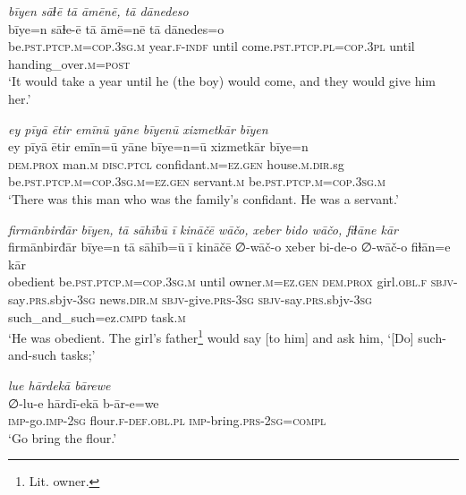 \ea \label{RE.15}
\textit{bīyen sāɫē tā āmēnē, tā dānedeso} \\ 
\gll bīye=n sāɫe-ē tā āmē=nē tā dānedes=o \\ 
 be\textsc{.pst}\textsc{.ptcp}\textsc{.m}\textsc{=cop}\textsc{.3sg}\textsc{.m} year\textsc{.f}\textsc{-indf} until come\textsc{.pst}\textsc{.ptcp}\textsc{.pl}\textsc{=cop}\textsc{.3pl} until handing\_over\textsc{.m}\textsc{=\textsc{post}} \\ 
\glt `It would take a year until he (the boy) would come, and they would give him her.'
\z 
 
\ea \label{RE.16}
\textit{ey pīyā ētir emīnū yāne bīyenū xizmetkār bīyen} \\ 
\gll ey pīyā ētir emīn=ū yāne bīye=n=ū xizmetkār bīye=n \\ 
 \textsc{dem.prox} man\textsc{.m} \textsc{disc.ptcl} confidant\textsc{.m}\textsc{=ez.gen} house\textsc{.m}\textsc{.dir}.sg be\textsc{.pst}\textsc{.ptcp}\textsc{.m}\textsc{=cop}\textsc{.3sg}\textsc{.m}\textsc{=ez.gen} servant\textsc{.m} be\textsc{.pst}\textsc{.ptcp}\textsc{.m}\textsc{=cop}\textsc{.3sg}\textsc{.m} \\ 
\glt `There was this man who was the family’s confidant. He was a servant.'
\z 
 
\ea \label{RE.18}
\textit{firmānbirđār bīyen, tā sāhībū ī kināčē wāčo, xeber bido wāčo, fiɫāne kār} \\ 
\gll firmānbirđār bīye=n tā sāhīb=ū ī kināčē ∅-wāč-o xeber bi-de-o ∅-wāč-o fiɫān=e kār \\ 
 obedient be\textsc{.pst}\textsc{.ptcp}\textsc{.m}\textsc{=cop}\textsc{.3sg}\textsc{.m} until owner\textsc{.m}\textsc{=ez.gen} \textsc{dem.prox} girl\textsc{.obl}\textsc{.f} \textsc{sbjv-}say\textsc{.prs}.sbjv\textsc{-3sg} news\textsc{.dir}\textsc{.m} \textsc{sbjv-}give\textsc{.prs}\textsc{-3sg} \textsc{sbjv-}say\textsc{.prs}.sbjv\textsc{-3sg} such\_and\_such=ez\textsc{.cmpd} task\textsc{.m} \\ 
\glt `He was obedient. The girl’s father\footnote{Lit. owner.} would say [to him] and ask him, ‘[Do] such-and-such tasks;'
\z 
 
\ea \label{RE.19}
\textit{lue hārdekā bārewe} \\ 
\gll ∅-lu-e hārdī-ekā b-ār-e=we \\ 
 \textsc{imp-}go.\textsc{imp-}\textsc{2sg} flour\textsc{.f}\textsc{-def}\textsc{.obl}\textsc{.pl} \textsc{imp-}bring\textsc{.prs}-\textsc{2sg}\textsc{=compl} \\ 
\glt `Go bring the flour.'
\z 
 
